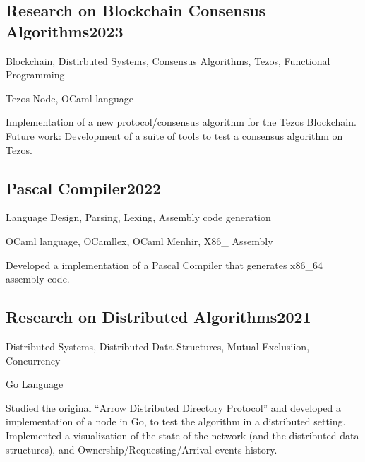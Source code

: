 \documentclass[a4paper, 12pt]{article}
\begin{document}
\subsection {{Research on Blockchain Consensus Algorithms}\hfill 2023}
\begin{zitemize}
\item Blockchain, Distirbuted Systems, Consensus Algorithms, Tezos, Functional Programming
\item Tezos Node, OCaml language
\item Implementation of a new protocol/consensus algorithm for the Tezos Blockchain. Future work: Development of a suite of tools to test a consensus algorithm on Tezos.
\end{zitemize}

\vspace*{6pt}
\subsection {{Pascal Compiler}\hfill 2022}
\begin{zitemize}
\item Language Design, Parsing, Lexing, Assembly code generation
\item OCaml language, OCamllex, OCaml Menhir, X86\_ Assembly
\item Developed a implementation of a Pascal Compiler that generates x86\_64 assembly code.
\end{zitemize}


\vspace*{6pt}
\subsection {{Research on Distributed Algorithms}\hfill 2021}
\begin{zitemize}
\item Distributed Systems, Distributed Data Structures, Mutual Exclusiion, Concurrency
\item Go Language
\item Studied the original ``Arrow Distributed Directory Protocol'' and developed a implementation of a node in Go, to test the algorithm in a distributed setting. Implemented a visualization of the state of the network (and the distributed data structures), and Ownership/Requesting/Arrival events history.
\end{zitemize}
\end{document}

